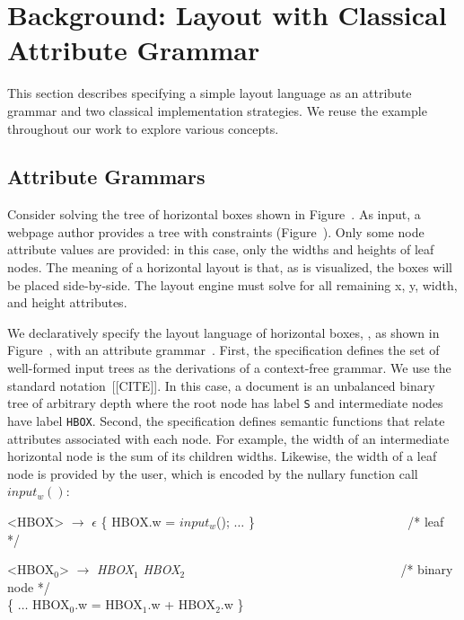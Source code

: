 \section{Background: Layout with Classical Attribute Grammar}

This section describes specifying a simple layout language as an attribute grammar and two classical implementation strategies. We reuse the example throughout our work to explore various concepts.



\subsection{Attribute Grammars}

Consider solving the tree of horizontal boxes shown in Figure~. As input, a webpage author provides a tree with constraints (Figure~). Only some node attribute values are provided: in this case, only the widths and heights of leaf nodes. The meaning of a horizontal layout is that, as is visualized, the boxes will be placed side-by-side. The layout engine must solve for all remaining x, y, width, and height attributes. 

We declaratively specify the layout language of horizontal boxes, \hlang{},  as shown in Figure~, with an attribute grammar~\cite{oag,Meyerovich:2010,htmlag}. First, the specification defines the set of well-formed input trees as the derivations of a context-free grammar. We use the standard notation~[[CITE]]. In this case, a document is an unbalanced binary tree of arbitrary depth where the root node has label \texttt{S} and intermediate nodes have label \texttt{HBOX}. Second, the specification defines semantic functions that relate attributes associated with each node. For example, the width of an intermediate horizontal node is the sum of its children widths. Likewise, the width of a leaf node is provided by the user, which is encoded by the nullary function call $input_w()$:


\begin{grammar}
<HBOX> $\rightarrow$ $\epsilon$ \{ HBOX.w = $input_w$(); $\ldots$ \} ~~~~~~~~~~~~~~~~~~~~~~~ /* leaf */

<HBOX$_0$> $\rightarrow$ \emph{HBOX$_1$} \emph{HBOX$_2$} ~~~~~~~~~~~~~~~~~~~~~~~~~~~~~~~~~ /* binary node */\\
\{ $\ldots$ HBOX$_0$.w = HBOX$_1$.w + HBOX$_2$.w \} 
\end{grammar}


